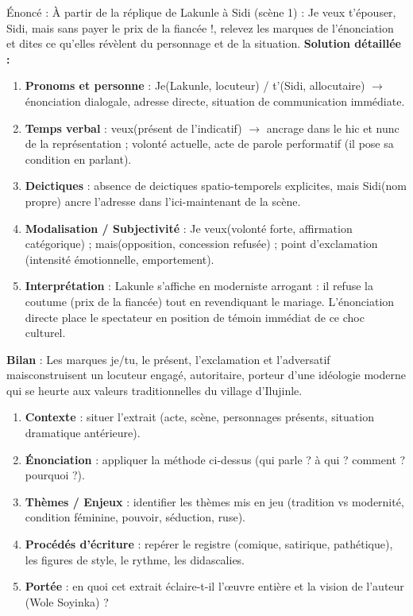 \documentclass[11pt]{article}
\newcommand{\cle}[1]{{\popxbold\color{popdark}#1}}
\begin{document}
\begin{exoresolu}
Énoncé : À partir de la réplique de Lakunle à Sidi (scène 1) : \og Je veux t'épouser, Sidi, mais sans payer le prix de la fiancée !\fg, relevez les marques de l'énonciation et dites ce qu'elles révèlent du personnage et de la situation.
\tcblower
\textbf{Solution détaillée :}
\begin{enumerate}
\item \textbf{Pronoms et personne} : \og Je\fg (Lakunle, locuteur) / \og t'\fg (Sidi, allocutaire) $\rightarrow$ énonciation \cle{dialogale}, adresse directe, situation de communication immédiate.
\item \textbf{Temps verbal} : \og veux\fg (présent de l'indicatif) $\rightarrow$ ancrage dans le \cle{ hic et nunc} de la représentation ; volonté actuelle, acte de parole performatif (il pose sa condition en parlant).
\item \textbf{Deictiques} : absence de deictiques spatio-temporels explicites, mais \og Sidi\fg (nom propre) ancre l'adresse dans l'ici-maintenant de la scène.
\item \textbf{Modalisation / Subjectivité} : \og Je veux\fg (volonté forte, affirmation catégorique) ; \og mais\fg (opposition, concession refusée) ; point d'exclamation (intensité émotionnelle, emportement).
\item \textbf{Interprétation} : Lakunle s'affiche en \cle{moderniste arrogant} : il refuse la coutume (\og prix de la fiancée\fg) tout en revendiquant le mariage. L'énonciation directe place le spectateur en position de témoin immédiat de ce choc culturel.
\end{enumerate}
\textbf{Bilan} : Les marques \og je/tu\fg, le présent, l'exclamation et l'adversatif \og mais\fg construisent un locuteur engagé, autoritaire, porteur d'une idéologie moderne qui se heurte aux valeurs traditionnelles du village d'Ilujinle.
\end{exoresolu}

\begin{exemplebox}
\begin{enumerate}
\item \textbf{Contexte} : situer l'extrait (acte, scène, personnages présents, situation dramatique antérieure).
\item \textbf{Énonciation} : appliquer la méthode ci-dessus (qui parle ? à qui ? comment ? pourquoi ?).
\item \textbf{Thèmes / Enjeux} : identifier les thèmes mis en jeu (tradition vs modernité, condition féminine, pouvoir, séduction, ruse).
\item \textbf{Procédés d'écriture} : repérer le registre (comique, satirique, pathétique), les figures de style, le rythme, les didascalies.
\item \textbf{Portée} : en quoi cet extrait éclaire-t-il l'œuvre entière et la vision de l'auteur (Wole Soyinka) ?
\end{enumerate}
\end{exemplebox}
\end{document}
